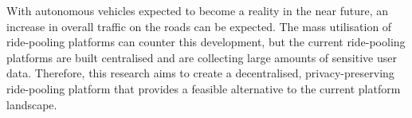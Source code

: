 
With autonomous vehicles expected to become a reality in the near future, an increase in overall traffic on the roads can be expected. The mass utilisation of ride-pooling platforms can counter this development, but the current ride-pooling platforms are built centralised and are collecting large amounts of sensitive user data. Therefore, this research aims to create a decentralised, privacy-preserving ride-pooling platform that provides a feasible alternative to the current platform landscape.